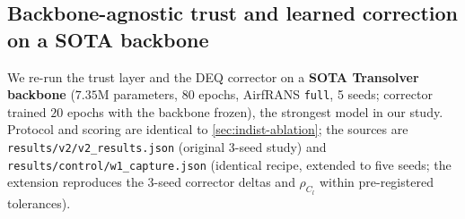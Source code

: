
\subsection{Backbone-agnostic trust and learned correction on a SOTA backbone}
\label{sec:v2}

We re-run the trust layer and the DEQ corrector on a \textbf{SOTA Transolver backbone}
($7.35$M parameters, 80 epochs, AirfRANS \texttt{full}, 5 seeds; corrector trained $20$
epochs with the backbone frozen), the strongest model in our study. Protocol and scoring
are identical to \autoref{sec:indist-ablation}; the sources are
\texttt{results/v2/v2\_results.json} (original 3-seed study) and
\texttt{results/control/w1\_capture.json} (identical recipe, extended to five seeds; the
extension reproduces the 3-seed corrector deltas and $\rho_{C_l}$ within pre-registered
tolerances).

\begin{table}[t]
\centering
\small
\caption{SOTA Transolver backbone ($7.35$M params, 80 ep, AirfRANS \texttt{full}), alone
vs.\ with the DEQ correction loop. 5 seeds, mean $\pm$ std (population std,
\texttt{ddof=0}). Lower MSE is better;
$\rho$ closer to 1 is better;
resid$\leftrightarrow$err $\rho > 0$ supports the trust signal. The $C_l$/$C_d$ columns
are relative error against the ground-truth field's own integrated forces, not against the
official labels; the paragraph after next states what that integrator can and cannot see.
Source: \texttt{results/control/w1\_capture.json} (5-seed extension of
\texttt{results/v2/v2\_results.json}).}
\label{tab:v2}
\end{table}

